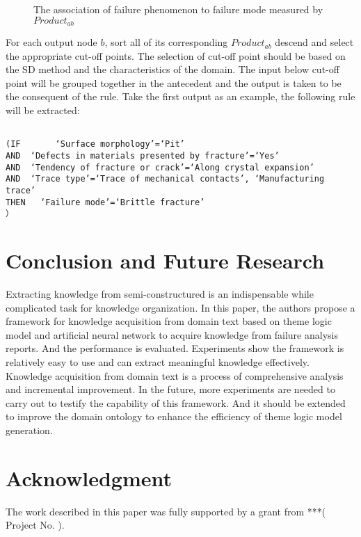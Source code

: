 \documentclass{elsarticle}
\begin{document}
 \begin{figure}[htb]
  \centering
  \caption{The association of failure phenomenon to failure mode measured by $Product_{ab}$
}
\label{fig:7}
\end{figure}

For each output node $b$, sort all of its corresponding $Product_{ab}$
descend and select the appropriate cut-off points. The selection of
cut-off point should be based on the SD method and the characteristics
of the domain. The input below cut-off point will be grouped together
in the antecedent and the output is taken to be the consequent of the
rule. Take the first output as an example, the following rule will be
extracted:
\begin{verbatim}

(IF       ‘Surface morphology’=‘Pit’ 
AND  ‘Defects in materials presented by fracture’=‘Yes’
AND  ‘Tendency of fracture or crack’=‘Along crystal expansion’
AND  ‘Trace type’=‘Trace of mechanical contacts’, ‘Manufacturing trace’
THEN   ‘Failure mode’=‘Brittle fracture’
）

\end{verbatim}

\section{Conclusion and Future Research 
}
\label{sec:concl-future-rese}

Extracting knowledge from semi-constructured is an indispensable while
complicated task for knowledge organization. In this paper, the authors
propose a framework for knowledge acquisition from domain text
based on theme logic model and artificial neural network to acquire knowledge from
failure analysis reports. And the  performance is evaluated. Experiments show the framework is relatively
easy to use and can extract meaningful knowledge effectively. 
Knowledge acquisition from domain text is a process of comprehensive
analysis and incremental improvement. In the future, more experiments are
needed to carry out to testify the capability of this framework. And
it should be extended to improve the domain ontology to enhance the
efficiency of theme logic model generation.

\section{Acknowledgment}
\label{sec:acknowledgment}

The work described in this paper was fully supported by a grant from ***( Project No.  ). 





\end{document}
